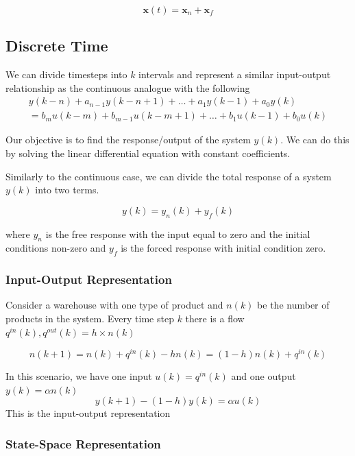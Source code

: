 \documentclass[11pt]{article}
\begin{document}
\begin{equation}
  \textbf{x}(t) = \textbf{x}_n + \textbf{x}_f 
\end{equation}

\subsection{Discrete Time}
We can divide timesteps into $k$ intervals and represent a similar input-output relationship as the continuous analogue with the following
\begin{align}
  y(k-n) + a_{n-1} y(k-n+1) + \dots + a_1 y(k-1) + a_0 y(k) \\
  = b_m u(k-m) + b_{m-1} u(k-m + 1) + \dots + b_1 u(k-1) + b_0 u(k)
\end{align}

Our objective is to find the response/output of the system $y(k)$.
We can do this by solving the linear differential equation with constant coefficients.

Similarly to the continuous case, we can divide the total response of a system $y(k)$ into two terms.

\begin{equation}
  y(k) = y_n(k) + y_f(k)
\end{equation}

where $y_n$ is the free response with the input equal to zero and the initial conditions non-zero and $y_f$ is the forced response with initial condition zero.

\subsubsection{Input-Output Representation}
Consider a warehouse with one type of product and $n(k)$ be the number of products in the system.
Every time step $k$ there is a flow $q^{in}(k), q^{out}(k) = h \times n(k) $

\begin{equation}
  n(k+1) = n(k) + q^{in}(k) - hn(k) = (1-h) n(k) + q^{in}(k)
\end{equation}

In this scenario, we have one input $u(k) = q^{in}(k)$ and one output $y(k) = \alpha n(k)$
\begin{equation}
  y(k+1) - (1-h)y(k) = \alpha u (k)
\end{equation}
This is the input-output representation

\subsubsection{State-Space Representation}
\end{document}
